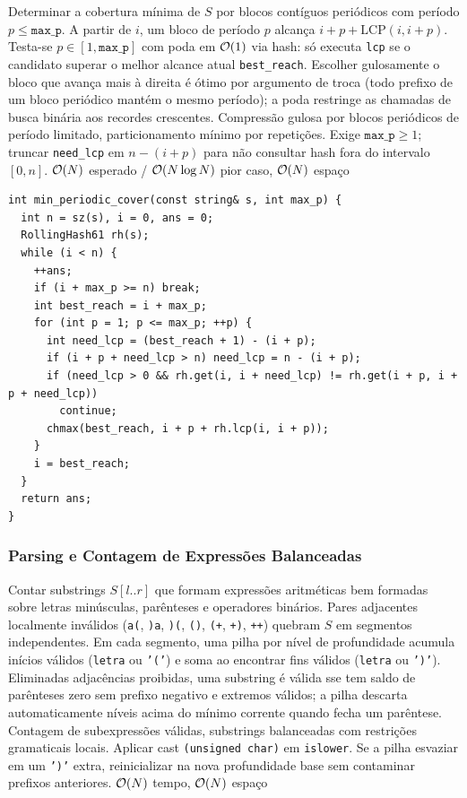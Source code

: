 \algobox
  {Determinar a cobertura mínima de $S$ por blocos contíguos periódicos com período $p \le \texttt{max\_p}$.}
  {A partir de $i$, um bloco de período $p$ alcança $i + p + \text{LCP}(i, i + p)$. Testa-se $p \in [1, \texttt{max\_p}]$ com poda em $\mathcal{O}(1)$ via hash: só executa \texttt{lcp} se o candidato superar o melhor alcance atual \texttt{best\_reach}.}
  {Escolher gulosamente o bloco que avança mais à direita é ótimo por argumento de troca (todo prefixo de um bloco periódico mantém o mesmo período); a poda restringe as chamadas de busca binária aos recordes crescentes.}
  {Compressão gulosa por blocos periódicos de período limitado, particionamento mínimo por repetições.}
  {Exige $\texttt{max\_p} \ge 1$; truncar \texttt{need\_lcp} em $n - (i + p)$ para não consultar hash fora do intervalo $[0, n]$.}
  {$\mathcal{O}(N)$ esperado / $\mathcal{O}(N \log N)$ pior caso, $\mathcal{O}(N)$ espaço}

\begin{lstlisting}
int min_periodic_cover(const string& s, int max_p) {
  int n = sz(s), i = 0, ans = 0;
  RollingHash61 rh(s);
  while (i < n) {
    ++ans;
    if (i + max_p >= n) break;
    int best_reach = i + max_p;
    for (int p = 1; p <= max_p; ++p) {
      int need_lcp = (best_reach + 1) - (i + p);
      if (i + p + need_lcp > n) need_lcp = n - (i + p);
      if (need_lcp > 0 && rh.get(i, i + need_lcp) != rh.get(i + p, i + p + need_lcp))
        continue;
      chmax(best_reach, i + p + rh.lcp(i, i + p));
    }
    i = best_reach;
  }
  return ans;
}
\end{lstlisting}

\subsubsection{Parsing e Contagem de Expressões Balanceadas}
\algobox
  {Contar substrings $S[l..r]$ que formam expressões aritméticas bem formadas sobre letras minúsculas, parênteses e operadores binários.}
  {Pares adjacentes localmente inválidos (\texttt{a(}, \texttt{)a}, \texttt{)(}, \texttt{()}, \texttt{(+}, \texttt{+)}, \texttt{++}) quebram $S$ em segmentos independentes. Em cada segmento, uma pilha por nível de profundidade acumula inícios válidos (\texttt{letra} ou \texttt{'('}) e soma ao encontrar fins válidos (\texttt{letra} ou \texttt{')'}).}
  {Eliminadas adjacências proibidas, uma substring é válida sse tem saldo de parênteses zero sem prefixo negativo e extremos válidos; a pilha descarta automaticamente níveis acima do mínimo corrente quando fecha um parêntese.}
  {Contagem de subexpressões válidas, substrings balanceadas com restrições gramaticais locais.}
  {Aplicar cast \texttt{(unsigned char)} em \texttt{islower}. Se a pilha esvaziar em um \texttt{')'} extra, reinicializar na nova profundidade base sem contaminar prefixos anteriores.}
  {$\mathcal{O}(N)$ tempo, $\mathcal{O}(N)$ espaço}

